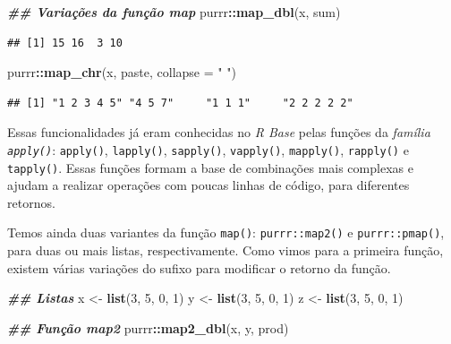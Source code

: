 \documentclass[
]{article}
\newenvironment{Shaded}{\begin{snugshade}}{\end{snugshade}}
\newcommand{\AttributeTok}[1]{\textcolor[rgb]{0.13,0.29,0.53}{#1}}
\newcommand{\DecValTok}[1]{\textcolor[rgb]{0.00,0.00,0.81}{#1}}
\newcommand{\DocumentationTok}[1]{\textcolor[rgb]{0.56,0.35,0.01}{\textbf{\textit{#1}}}}
\newcommand{\FunctionTok}[1]{\textcolor[rgb]{0.13,0.29,0.53}{\textbf{#1}}}
\newcommand{\NormalTok}[1]{#1}
\newcommand{\OtherTok}[1]{\textcolor[rgb]{0.56,0.35,0.01}{#1}}
\newcommand{\SpecialCharTok}[1]{\textcolor[rgb]{0.81,0.36,0.00}{\textbf{#1}}}
\newcommand{\StringTok}[1]{\textcolor[rgb]{0.31,0.60,0.02}{#1}}
\begin{document}
\begin{Shaded}
\begin{Highlighting}[]
\DocumentationTok{\#\# Variações da função map}
\NormalTok{purrr}\SpecialCharTok{::}\FunctionTok{map\_dbl}\NormalTok{(x, sum)}
\end{Highlighting}
\end{Shaded}

\begin{verbatim}
## [1] 15 16  3 10
\end{verbatim}

\begin{Shaded}
\begin{Highlighting}[]
\NormalTok{purrr}\SpecialCharTok{::}\FunctionTok{map\_chr}\NormalTok{(x, paste, }\AttributeTok{collapse =} \StringTok{" "}\NormalTok{)}
\end{Highlighting}
\end{Shaded}

\begin{verbatim}
## [1] "1 2 3 4 5" "4 5 7"     "1 1 1"     "2 2 2 2 2"
\end{verbatim}

Essas funcionalidades já eram conhecidas no \emph{R Base} pelas funções da \emph{família \texttt{apply()}}: \texttt{apply()}, \texttt{lapply()}, \texttt{sapply()}, \texttt{vapply()}, \texttt{mapply()}, \texttt{rapply()} e \texttt{tapply()}. Essas funções formam a base de combinações mais complexas e ajudam a realizar operações com poucas linhas de código, para diferentes retornos.

Temos ainda duas variantes da função \texttt{map()}: \texttt{purrr::map2()} e \texttt{purrr::pmap()}, para duas ou mais listas, respectivamente. Como vimos para a primeira função, existem várias variações do sufixo para modificar o retorno da função.

\begin{Shaded}
\begin{Highlighting}[]
\DocumentationTok{\#\# Listas}
\NormalTok{x }\OtherTok{\textless{}{-}} \FunctionTok{list}\NormalTok{(}\DecValTok{3}\NormalTok{, }\DecValTok{5}\NormalTok{, }\DecValTok{0}\NormalTok{, }\DecValTok{1}\NormalTok{)}
\NormalTok{y }\OtherTok{\textless{}{-}} \FunctionTok{list}\NormalTok{(}\DecValTok{3}\NormalTok{, }\DecValTok{5}\NormalTok{, }\DecValTok{0}\NormalTok{, }\DecValTok{1}\NormalTok{)}
\NormalTok{z }\OtherTok{\textless{}{-}} \FunctionTok{list}\NormalTok{(}\DecValTok{3}\NormalTok{, }\DecValTok{5}\NormalTok{, }\DecValTok{0}\NormalTok{, }\DecValTok{1}\NormalTok{)}

\DocumentationTok{\#\# Função map2}
\NormalTok{purrr}\SpecialCharTok{::}\FunctionTok{map2\_dbl}\NormalTok{(x, y, prod)}
\end{Highlighting}
\end{Shaded}
\end{document}
